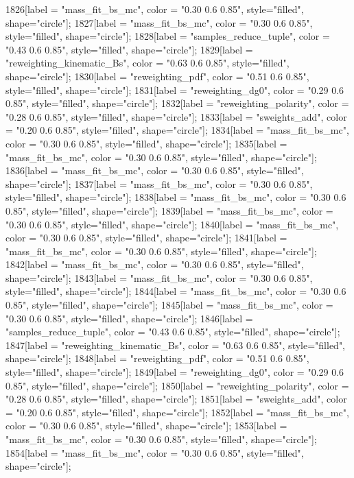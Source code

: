 {	1826[label = "mass_fit_bs_mc", color = "0.30 0.6 0.85", style="filled", shape="circle"];
	1827[label = "mass_fit_bs_mc", color = "0.30 0.6 0.85", style="filled", shape="circle"];
	1828[label = "samples_reduce_tuple", color = "0.43 0.6 0.85", style="filled", shape="circle"];
	1829[label = "reweighting_kinematic_Bs", color = "0.63 0.6 0.85", style="filled", shape="circle"];
	1830[label = "reweighting_pdf", color = "0.51 0.6 0.85", style="filled", shape="circle"];
	1831[label = "reweighting_dg0", color = "0.29 0.6 0.85", style="filled", shape="circle"];
	1832[label = "reweighting_polarity", color = "0.28 0.6 0.85", style="filled", shape="circle"];
	1833[label = "sweights_add", color = "0.20 0.6 0.85", style="filled", shape="circle"];
	1834[label = "mass_fit_bs_mc", color = "0.30 0.6 0.85", style="filled", shape="circle"];
	1835[label = "mass_fit_bs_mc", color = "0.30 0.6 0.85", style="filled", shape="circle"];
	1836[label = "mass_fit_bs_mc", color = "0.30 0.6 0.85", style="filled", shape="circle"];
	1837[label = "mass_fit_bs_mc", color = "0.30 0.6 0.85", style="filled", shape="circle"];
	1838[label = "mass_fit_bs_mc", color = "0.30 0.6 0.85", style="filled", shape="circle"];
	1839[label = "mass_fit_bs_mc", color = "0.30 0.6 0.85", style="filled", shape="circle"];
	1840[label = "mass_fit_bs_mc", color = "0.30 0.6 0.85", style="filled", shape="circle"];
	1841[label = "mass_fit_bs_mc", color = "0.30 0.6 0.85", style="filled", shape="circle"];
	1842[label = "mass_fit_bs_mc", color = "0.30 0.6 0.85", style="filled", shape="circle"];
	1843[label = "mass_fit_bs_mc", color = "0.30 0.6 0.85", style="filled", shape="circle"];
	1844[label = "mass_fit_bs_mc", color = "0.30 0.6 0.85", style="filled", shape="circle"];
	1845[label = "mass_fit_bs_mc", color = "0.30 0.6 0.85", style="filled", shape="circle"];
	1846[label = "samples_reduce_tuple", color = "0.43 0.6 0.85", style="filled", shape="circle"];
	1847[label = "reweighting_kinematic_Bs", color = "0.63 0.6 0.85", style="filled", shape="circle"];
	1848[label = "reweighting_pdf", color = "0.51 0.6 0.85", style="filled", shape="circle"];
	1849[label = "reweighting_dg0", color = "0.29 0.6 0.85", style="filled", shape="circle"];
	1850[label = "reweighting_polarity", color = "0.28 0.6 0.85", style="filled", shape="circle"];
	1851[label = "sweights_add", color = "0.20 0.6 0.85", style="filled", shape="circle"];
	1852[label = "mass_fit_bs_mc", color = "0.30 0.6 0.85", style="filled", shape="circle"];
	1853[label = "mass_fit_bs_mc", color = "0.30 0.6 0.85", style="filled", shape="circle"];
	1854[label = "mass_fit_bs_mc", color = "0.30 0.6 0.85", style="filled", shape="circle"];
}
